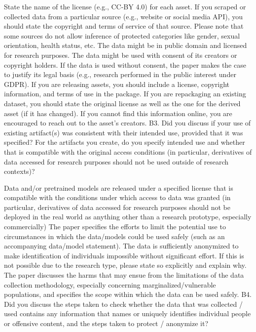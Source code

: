 State the name of the license (e.g., CC-BY 4.0) for each asset.
If you scraped or collected data from a particular source (e.g., website or social media API), you should state the copyright and terms of service of that source. Please note that some sources do not allow inference of protected categories like gender, sexual orientation, health status, etc.
The data might be in public domain and licensed for research purposes.
The data might be used with consent of its creators or copyright holders.
If the data is used without consent, the paper makes the case to justify its legal basis (e.g., research performed in the public interest under GDPR).
If you are releasing assets, you should include a license, copyright information, and terms of use in the package.
If you are repackaging an existing dataset, you should state the original license as well as the one for the derived asset (if it has changed).
If you cannot find this information online, you are encouraged to reach out to the asset’s creators.
B3. Did you discuss if your use of existing artifact(s) was consistent with their intended use, provided that it was specified? For the artifacts you create, do you specify intended use and whether that is compatible with the original access conditions (in particular, derivatives of data accessed for research purposes should not be used outside of research contexts)?

Data and/or pretrained models are released under a specified license that is compatible with the conditions under which access to data was granted (in particular, derivatives of data accessed for research purposes should not be deployed in the real world as anything other than a research prototype, especially commercially)
The paper specifies the efforts to limit the potential use to circumstances in which the data/models could be used safely (such as an accompanying data/model statement).
The data is sufficiently anonymized to make identification of individuals impossible without significant effort. If this is not possible due to the research type, please state so explicitly and explain why.
The paper discusses the harms that may ensue from the limitations of the data collection methodology, especially concerning marginalized/vulnerable populations, and specifies the scope within which the data can be used safely.
B4. Did you discuss the steps taken to check whether the data that was collected / used contains any information that names or uniquely identifies individual people or offensive content, and the steps taken to protect / anonymize it?

